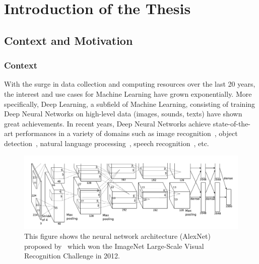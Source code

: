 \chapter{Introduction of the Thesis}
\label{chapter:ch1-introduction}
\localtableofcontents

\section{Context and Motivation}
\label{section:ch1-context_and_motivation}

\subsection{Context}
\label{subsection:ch1-context}

With the surge in data collection and computing resources over the last 20 years, the interest and use cases for Machine Learning have grown exponentially.
More specifically, Deep Learning, a subfield of Machine Learning, consisting of training Deep Neural Networks on high-level
data (images, sounds, texts) have shown great achievements.
In recent years, Deep Neural Networks achieve state-of-the-art performances in a variety of domains such as image recognition~\cite{lecun1998gradient,krizhevsky2012imagenet,he2016deep,tan2019efficientnet}, object detection~\cite{redmon2016you,liu2016ssd,redmon2017yolo9000}, natural language processing~\cite{merity2016pointer,radford2018Language,brown2020language}, speech recognition~\cite{hinton2012deep,abdel2014convolutional,yu2016automatic}, etc.

\begin{figure}[t]
  \centering
  \includegraphics[scale=0.2]{figures/ch1-introduction/alexnet.png}
  \caption{This figure shows the neural network architecture (AlexNet) proposed by~\citet{krizhevsky2012imagenet} which won the ImageNet Large-Scale Visual Recognition Challenge in 2012.}
  \label{figure:ch1-alexnet_network}
\end{figure}


